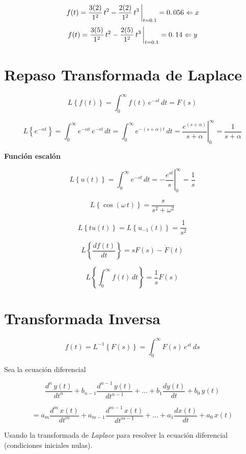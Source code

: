 $$\left. f(t) = \dfrac{3(2)}{1^2}\, t^2 - \dfrac{2(2)}{1^2}\, t^3\, \right|_{t = 0\ldotp1} = 0\ldotp056 \Leftarrow x$$
$$\left. f(t) = \dfrac{3(5)}{1^2}\, t^2 - \dfrac{2(5)}{1^2}\, t^3\, \right|_{t = 0\ldotp1} = 0\ldotp14 \Leftarrow y$$



\section{Repaso Transformada de Laplace}

$$L\left\lbrace f(t) \right\rbrace = \displaystyle \int_{0}^{\infty} f(t)\,e^{-st}\, dt = F(s)$$

$$\left. L\left\lbrace e^{-\alpha t} \right\rbrace = \displaystyle \int_{0}^{\infty} e^{-\alpha t}\,e^{-st}\, dt = \displaystyle \int_{0}^{\infty} e^{-(s + \alpha)t}\, dt = \dfrac{e^{(s + \alpha)}}{s + \alpha}\right|_{0}^{\infty} = \dfrac{1}{s + \alpha}$$

\textbf{Función escalón}

$$\left. L\left\lbrace u(t) \right\rbrace = \displaystyle \int_{0}^{\infty} e^{-st}\, dt = - \dfrac{e^{st}}{s} \right|_{0}^{\infty} = \dfrac{1}{s}$$

$$ L\left\lbrace \cos (\omega\, t) \right\rbrace = \dfrac{s}{s^2 + \omega^2}$$

$$ L\left\lbrace tu(t) \right\rbrace = L\left\lbrace u_{-1}(t) \right\rbrace = \dfrac{1}{s^2}$$

$$ L\left\lbrace \dfrac{df(t)}{dt} \right\rbrace = sF(s) - \dot{F}(t)$$

$$ L\left\lbrace \displaystyle \int_{0}^{\infty} f(t)\, dt \right\rbrace = \dfrac{1}{s} F(s)$$




\section{Transformada Inversa}

$$f(t) = L^{-1} \left\lbrace F(s) \right\rbrace = \displaystyle \int_{0}^{\infty} F(s)\, e^{st}\, ds$$

Sea la ecuación diferencial

$$\dfrac{d^n\, y(t)}{dt^{n}} + b_{n -1} \dfrac{d^{n - 1}\, y(t)}{dt^{n - 1}} + \ldots + b_{1} \dfrac{dy(t)}{dt} + b_{0}\,y(t)$$

$$= a_{m}\dfrac{d^m\, x(t)}{dt^{m}} + a_{m -1} \dfrac{d^{m - 1}\, x(t)}{dt^{m - 1}} + \ldots + a_{1} \dfrac{dx(t)}{dt} + a_{0}\,x(t)$$

Usando la transformada de \textit{Laplace} para resolver la ecuación diferencial 
(condiciones iniciales nulas).

